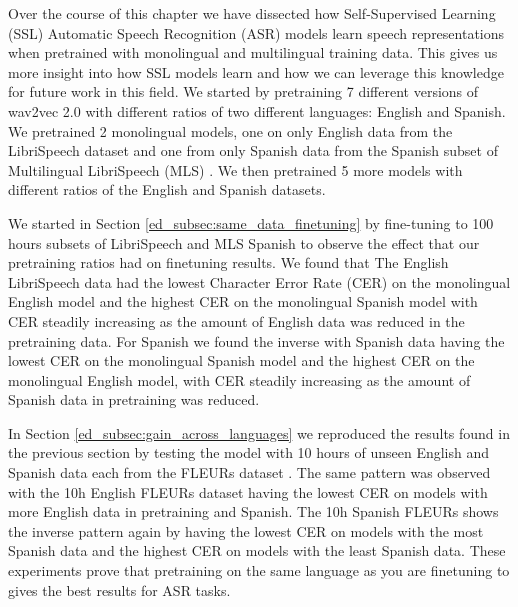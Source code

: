 \begin{table}
Over the course of this chapter we have dissected how Self-Supervised Learning (SSL) Automatic Speech Recognition (ASR) models learn speech representations when pretrained with monolingual and multilingual training data. This gives us more insight into how SSL models learn and how we can leverage this knowledge for future work in this field. We started by pretraining 7 different versions of wav2vec 2.0 \cite{wav2vec} with different ratios of two different languages: English and Spanish. We pretrained 2 monolingual models, one on only English data from the LibriSpeech dataset \cite{librispeech} and one from only Spanish data from the Spanish subset of Multilingual LibriSpeech (MLS) \cite{MLS}. We then pretrained 5 more models with different ratios of the English and Spanish datasets.

We started in Section \ref{ed_subsec:same_data_finetuning} by fine-tuning to 100 hours subsets of LibriSpeech and MLS Spanish to observe the effect that our pretraining ratios had on finetuning results. We found that The English LibriSpeech data had the lowest Character Error Rate (CER) on the monolingual English model and the highest CER on the monolingual Spanish model with CER steadily increasing as the amount of English data was reduced in the pretraining data. For Spanish we found the inverse with Spanish data having the lowest CER on the monolingual Spanish model and the highest CER on the monolingual English model, with CER steadily increasing as the amount of Spanish data in pretraining was reduced.

In Section \ref{ed_subsec:gain_across_languages} we reproduced the results found in the previous section by testing the model with 10 hours of unseen English and Spanish data each from the FLEURs dataset \cite{FLEURS}. The same pattern was observed with the 10h English FLEURs dataset having the lowest CER on models with more English data in pretraining and Spanish. The 10h Spanish FLEURs shows the inverse pattern again by having the lowest CER on models with the most Spanish data and the highest CER on models with the least Spanish data. These experiments prove that pretraining on the same language as you are finetuning to gives the best results for ASR tasks.


\end{table}

